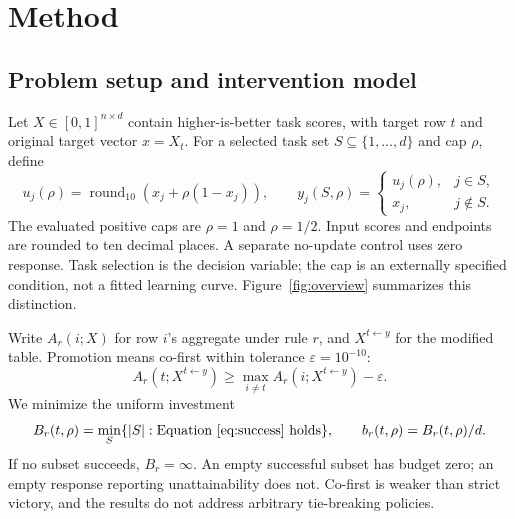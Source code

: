 \documentclass{article}
\newcommand{\budget}{B}
\newcommand{\tol}{\varepsilon}
\begin{document}
\section{Method}
\subsection{Problem setup and intervention model}
Let $X\in[0,1]^{n\times d}$ contain higher-is-better task scores, with target row $t$ and original target vector $x=X_t$. For a selected task set $S\subseteq\{1,\ldots,d\}$ and cap $\rho$, define
\begin{equation}
 u_j(\rho)=\operatorname{round}_{10}\!\left(x_j+\rho(1-x_j)\right),\qquad
 y_j(S,\rho)=\begin{cases}u_j(\rho),&j\in S,\\x_j,&j\notin S.\end{cases}
 \label{eq:response}
\end{equation}
The evaluated positive caps are $\rho=1$ and $\rho=1/2$. Input scores and endpoints are rounded to ten decimal places. A separate no-update control uses zero response. Task selection is the decision variable; the cap is an externally specified condition, not a fitted learning curve. Figure~\ref{fig:overview} summarizes this distinction.

Write $A_r(i;X)$ for row $i$'s aggregate under rule $r$, and $X^{t\leftarrow y}$ for the modified table. Promotion means co-first within tolerance $\tol=10^{-10}$:
\begin{equation}
 A_r(t;X^{t\leftarrow y})\geq \max_{i\ne t} A_r(i;X^{t\leftarrow y})-\tol.
 \label{eq:success}
\end{equation}
We minimize the uniform investment
\begin{equation}
 \budget_r(t,\rho)=\min_S\{|S|:\text{Equation~\eqref{eq:success} holds}\},
 \qquad b_r(t,\rho)=\budget_r(t,\rho)/d.
 \label{eq:objective}
\end{equation}
If no subset succeeds, $\budget_r=\infty$. An empty successful subset has budget zero; an empty response reporting unattainability does not. Co-first is weaker than strict victory, and the results do not address arbitrary tie-breaking policies.
\end{document}
